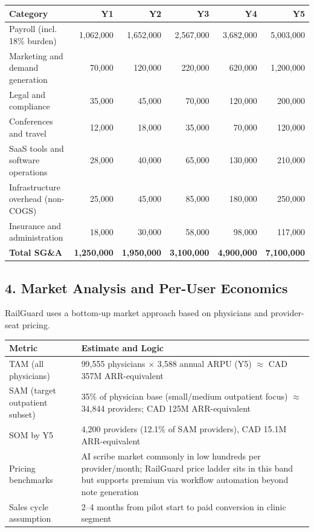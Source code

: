 \documentclass[11pt]{article}
\begin{document}
\begin{center}
\begin{tabular}{lrrrrr}
\toprule
\textbf{Category} & \textbf{Y1} & \textbf{Y2} & \textbf{Y3} & \textbf{Y4} & \textbf{Y5} \\
\midrule
Payroll (incl. 18\% burden) & 1,062,000 & 1,652,000 & 2,567,000 & 3,682,000 & 5,003,000 \\
Marketing and demand generation & 70,000 & 120,000 & 220,000 & 620,000 & 1,200,000 \\
Legal and compliance & 35,000 & 45,000 & 70,000 & 120,000 & 200,000 \\
Conferences and travel & 12,000 & 18,000 & 35,000 & 70,000 & 120,000 \\
SaaS tools and software operations & 28,000 & 40,000 & 65,000 & 130,000 & 210,000 \\
Infrastructure overhead (non-COGS) & 25,000 & 45,000 & 85,000 & 180,000 & 250,000 \\
Insurance and administration & 18,000 & 30,000 & 58,000 & 98,000 & 117,000 \\
\midrule
\textbf{Total SG\&A} & \textbf{1,250,000} & \textbf{1,950,000} & \textbf{3,100,000} & \textbf{4,900,000} & \textbf{7,100,000} \\
\bottomrule
\end{tabular}
\end{center}

\subsection*{4. Market Analysis and Per-User Economics}
RailGuard uses a bottom-up market approach based on physicians and provider-seat pricing.

\begin{center}
\begin{tabular}{p{} p{}}
\toprule
\textbf{Metric} & \textbf{Estimate and Logic} \\
\midrule
TAM (all physicians) & 99,555 physicians $\times$ 3,588 annual ARPU (Y5) $\approx$ CAD 357M ARR-equivalent \\
SAM (target outpatient subset) & 35\% of physician base (small/medium outpatient focus) $\approx$ 34,844 providers; CAD 125M ARR-equivalent \\
SOM by Y5 & 4,200 providers (12.1\% of SAM providers), CAD 15.1M ARR-equivalent \\
Pricing benchmarks & AI scribe market commonly in low hundreds per provider/month; RailGuard price ladder sits in this band but supports premium via workflow automation beyond note generation \\
Sales cycle assumption & 2--4 months from pilot start to paid conversion in clinic segment \\
\bottomrule
\end{tabular}
\end{center}
\end{document}
